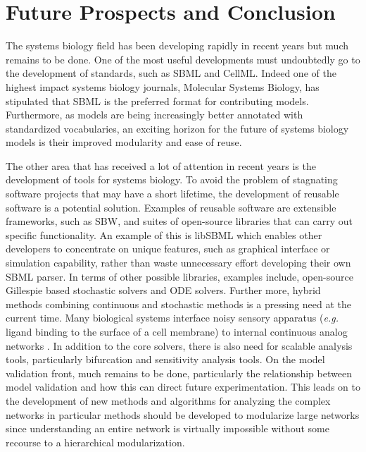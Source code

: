 \section{Future Prospects and Conclusion}

The systems biology field has been developing rapidly in recent years
but much remains to be done. One of the most useful developments must
undoubtedly go to the development of standards, such as SBML and CellML.
Indeed one of the highest impact systems biology journals, Molecular
Systems Biology, has stipulated that SBML is the preferred format for
contributing models. Furthermore, as models are being increasingly
better annotated with standardized vocabularies, an exciting horizon for
the future of systems biology models is their improved modularity and
ease of reuse.

The other area that has received a lot of attention in recent years is
the development of tools for systems biology. To avoid the problem of
stagnating software projects that may have a short lifetime, the
development of reusable software is a potential solution. Examples of
reusable software are extensible frameworks, such as SBW, and suites of
open-source libraries that can carry out specific functionality. An
example of this is libSBML which enables other developers to concentrate
on unique features, such as graphical interface or simulation
capability, rather than waste unnecessary effort developing their own
SBML parser. In terms of other possible libraries, examples include,
open-source Gillespie based stochastic solvers and ODE solvers. Further
more, hybrid methods combining continuous and stochastic methods is a
pressing need at the current time. Many biological systems interface
noisy sensory apparatus (\emph{e.g.} ligand binding to the surface of a
cell membrane) to internal continuous analog networks
\autocite{SauroReview:2004}. In addition to the core solvers, there is
also need for scalable analysis tools, particularly bifurcation and
sensitivity analysis tools. On the model validation front, much remains
to be done, particularly the relationship between model validation and
how this can direct future experimentation. This leads on to the
development of new methods and algorithms for analyzing the complex
networks in particular methods should be developed to modularize large
networks since understanding an entire network is virtually impossible
without some recourse to a hierarchical modularization.

